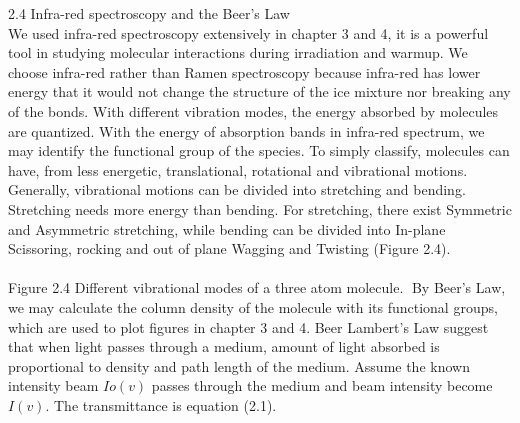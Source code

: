 2.4 Infra-red spectroscopy and the Beer’s Law\\
We used infra-red spectroscopy extensively in chapter 3 and 4, it is a powerful tool in studying molecular interactions during irradiation and warmup. We choose infra-red rather than Ramen spectroscopy because infra-red has lower energy that it would not change the structure of the ice mixture nor breaking any of the bonds. With different vibration modes, the energy absorbed by molecules are quantized. With the energy of absorption bands in infra-red spectrum, we may identify the functional group of the species. To simply classify, molecules can have, from less energetic, translational, rotational and vibrational motions. Generally, vibrational motions can be divided into stretching and bending. Stretching needs more energy than bending. For stretching, there exist Symmetric and Asymmetric stretching, while bending can be divided into In-plane Scissoring, rocking and out of plane Wagging and Twisting (Figure 2.4).\\

\\
Figure 2.4 Different vibrational modes of a three atom molecule.
By Beer’s Law, we may calculate the column density of the molecule with its functional groups, which are used to plot figures in chapter 3 and 4. Beer Lambert’s Law suggest that when light passes through a medium, amount of light absorbed is proportional to density and path length of the medium. Assume the known intensity beam $Io(v)$ passes through the medium and beam intensity become $I(v)$. The transmittance is equation (2.1).
\\





